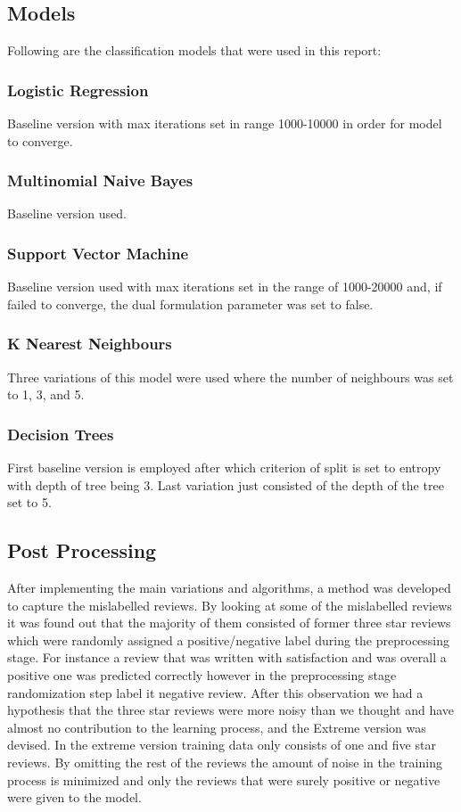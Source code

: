 \documentclass[conference]{IEEEtran}
\begin{document}
\subsection{Models}
Following are the classification models that were used in this report:
\subsubsection{Logistic Regression}
Baseline version with max iterations set in range 1000-10000 in order for model to converge.
\subsubsection{Multinomial Naive Bayes}
Baseline version used.
\subsubsection{Support Vector Machine}
Baseline version used with max iterations set in the range of 1000-20000 and, if failed to converge, the dual formulation parameter was set to false.
\subsubsection{K Nearest Neighbours}
Three variations of this model were used where the number of neighbours was set to 1, 3, and 5.
\subsubsection{Decision Trees}
First baseline version is employed after which criterion of split is set to entropy with depth of tree being 3. Last variation just consisted of the depth of the tree set to 5. 


\subsection{Post Processing}

After implementing the main variations and algorithms, a method was developed to capture the mislabelled reviews. By looking at some of the mislabelled reviews it was found out that the majority of them consisted of former three star reviews which were randomly assigned a positive/negative label during the preprocessing stage. For instance a review that was written with satisfaction and was overall a positive one was predicted correctly however in the preprocessing stage randomization step label it negative review. After this observation we had a hypothesis that the three star reviews were more noisy than we thought and have almost no contribution to the learning process, and the Extreme version was devised. In the extreme version training data only consists of one and five star reviews. By omitting the rest of the reviews the amount of noise in the training process is minimized and only the reviews that were surely positive or negative were given to the model. 
\end{document}

